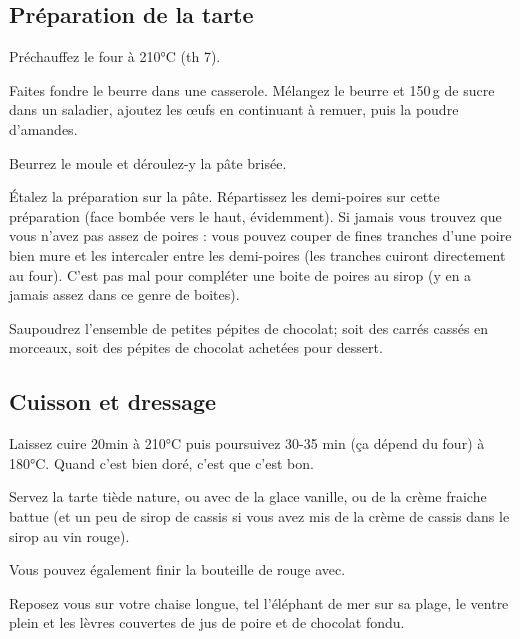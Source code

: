 \subsection*{Préparation de la tarte}

\begin{instructions}
	
	\item Préchauffez le four à 210°C (th 7).
	\item Faites fondre le beurre dans une casserole. Mélangez le beurre et
	150\,g de sucre dans un saladier, ajoutez les œufs en continuant à remuer,
	puis la poudre d'amandes.
	\item Beurrez le moule et déroulez-y la pâte brisée.
	\item Étalez la préparation sur la pâte. Répartissez les demi-poires sur
	cette préparation (face bombée vers le haut, évidemment). Si jamais vous
	trouvez que vous n'avez pas assez de poires : vous pouvez couper de fines
	tranches d'une poire bien mure et les intercaler entre les demi-poires
	(les tranches cuiront directement au four). C'est pas mal pour compléter
	une boite de poires au sirop (y en a jamais assez dans ce genre de
	boites).
	\item Saupoudrez l'ensemble de petites pépites de chocolat; soit des
	carrés cassés en morceaux, soit des pépites de chocolat achetées pour
	dessert.

\end{instructions}

\subsection{Cuisson et dressage}

\begin{instructions}

	\item Laissez cuire 20min à 210°C puis poursuivez 30-35 min (ça dépend du
	four) à 180°C. Quand c'est bien doré, c'est que c'est bon.
	\item Servez la tarte tiède nature, ou avec de la glace vanille, ou de la
	crème fraiche battue (et un peu de sirop de cassis si vous avez mis de la
	crème de cassis dans le sirop au vin rouge).
	\item Vous pouvez également finir la bouteille de rouge avec.

\end{instructions}

Reposez vous sur votre chaise longue, tel l’éléphant de mer sur sa plage, le
ventre plein et les lèvres couvertes de jus de poire et de chocolat fondu.
